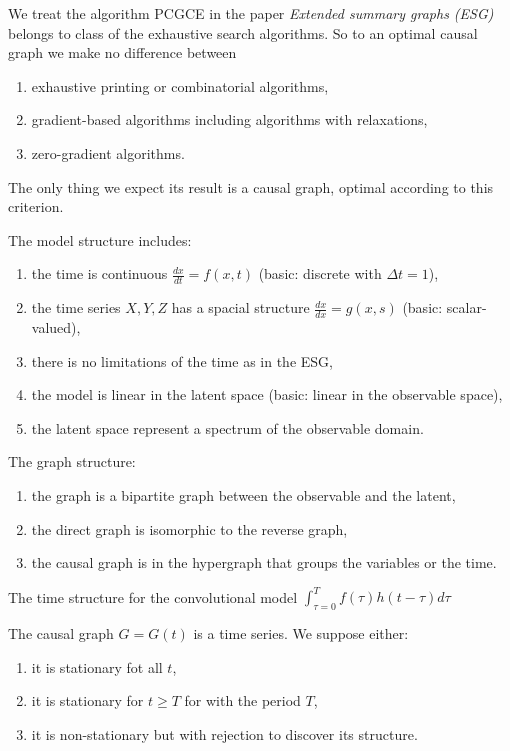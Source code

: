 \documentclass[12pt]{article}
\begin{document}
We treat the algorithm PCGCE in the paper \emph{Extended summary graphs (ESG)} belongs to
class of the exhaustive search algorithms.
So to an optimal causal graph we make no difference between
\begin{enumerate}[1)]
\item exhaustive printing or combinatorial algorithms,
\item gradient-based algorithms including algorithms with relaxations,
\item  zero-gradient algorithms.
\end{enumerate}
The only thing we expect its result is a causal graph, optimal according to this criterion.

\medskip
The model structure includes:
\begin{enumerate}[1)]
\item the time is continuous $\frac{dx}{dt}=f(x,t)$ (basic: discrete with $\Delta t=1$),
\item the time series $X, Y, Z$ has a spacial structure $\frac{dx}{dx} = g(x,s)$ (basic: scalar-valued),
\item there is no limitations of the time as in the ESG,
\item the model is linear in the latent space (basic: linear in the observable space),
\item the latent space represent a spectrum of the observable domain.
\end{enumerate}

\medskip
The graph structure:
\begin{enumerate}[1)]
\item the graph is a bipartite graph between the observable and the latent,
\item the direct graph is isomorphic to the reverse graph,
\item the causal graph is in the hypergraph that groups the variables or the time.
\end{enumerate}
The time structure for the convolutional model $\int_{\tau=0}^T f(\tau)h(t-\tau)d\tau $

\medskip
The causal graph $G=G(t)$ is a time series.
We suppose either:
\begin{enumerate}[1)]
\item it is stationary fot all $t$,
\item it is stationary for $t\geq T$ for with the period $T$,
\item it is non-stationary but with rejection to discover its structure.
\end{enumerate}
\end{document}
